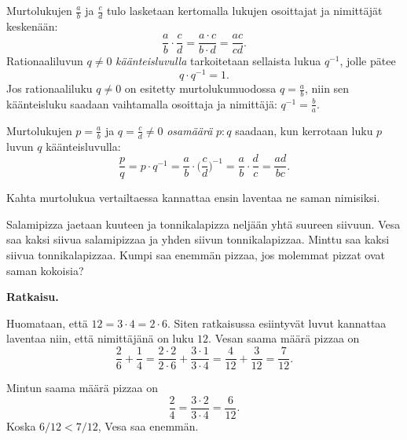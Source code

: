     Murtolukujen $\frac{a}{b}$ ja $\frac{c}{d}$ tulo lasketaan kertomalla lukujen osoittajat ja nimittäjät keskenään:
    \[
    \frac{a}{b}\cdot \frac{c}{d} = \frac{a\cdot c}{b\cdot d} = \frac{ac}{cd}.
    \]
    Rationaaliluvun $q\neq 0$ \emph{käänteisluvulla} tarkoitetaan sellaista lukua $q^{-1}$, jolle pätee
    \[
    q\cdot q^{-1} = 1.
    \]
    Jos rationaaliluku $q\neq 0$ on esitetty murtolukumuodossa $q=\frac{a}{b}$, niin sen käänteisluku saadaan vaihtamalla osoittaja ja nimittäjä: $q^{-1} = \frac{b}{a}$.
    
    Murtolukujen $p=\frac{a}{b}$ ja $q=\frac{c}{d}\neq 0$ \emph{osamäärä} $p : q$ saadaan, kun kerrotaan luku $p$ luvun $q$ käänteisluvulla:
    \[
    \frac{p}{q} = p\cdot q^{-1} = \frac{a}{b}\cdot\Big(\frac{c}{d}\Big)^{-1} = \frac{a}{b}\cdot \frac{d}{c}
    = \frac{ad}{bc}.
    \]
    
    
    
    
    Kahta murtolukua vertailtaessa kannattaa ensin laventaa ne saman nimisiksi.
    
    \begin{esimerkki}
        Salamipizza jaetaan kuuteen ja tonnikalapizza neljään yhtä suureen
        siivuun. Vesa saa kaksi siivua salamipizzaa ja yhden siivun tonnikalapizzaa.
        Minttu saa kaksi siivua tonnikalapizzaa. Kumpi saa enemmän pizzaa, jos
        molemmat pizzat ovat saman kokoisia?
        
        
        \textbf{Ratkaisu.}
        
        Huomataan, että $12 = 3\cdot 4 = 2\cdot 6$. Siten ratkaisussa esiintyvät
        luvut kannattaa laventaa niin, että nimittäjänä on luku $12$. Vesan saama
        määrä pizzaa on
        \[
            \frac{2}{6} + \frac{1}{4} = 
            \frac{2\cdot 2}{2\cdot 6} + \frac{3\cdot 1}{3\cdot 4} =
            \frac{4}{12}+\frac{3}{12} =
            \frac{7}{12}.
        \]
        
        Mintun saama määrä pizzaa on
        \[
            \frac{2}{4} =
            \frac{3\cdot 2}{3\cdot 4} =
            \frac{6}{12}.
        \]
        Koska $6/12 < 7/12$, Vesa saa enemmän.
    \end{esimerkki}
    
